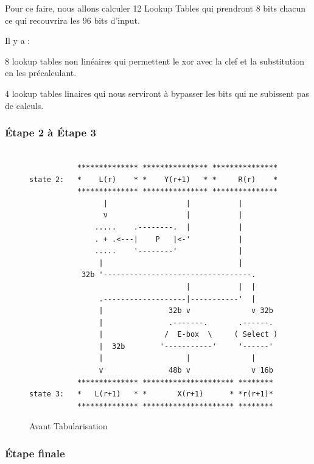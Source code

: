 \documentclass[a4paper,12pt]{article}
\begin{document}
\clearpage		
		
Pour ce faire, nous allons calculer 12 Lookup Tables qui prendront 8 bits chacun ce qui recouvrira les 96 bits d'input.

Il y a :

8 lookup tables non linéaires qui permettent le xor avec la clef et la substitution en les précalculant.


4 lookup tables linaires qui nous serviront à bypasser les bits qui ne subissent pas de calculs.		
		
\subsubsection{Étape 2 à Étape 3}

\begin{figure}[h]
\begin{verbatim}

           ************** *************** ***************
state 2:   *    L(r)    * *    Y(r+1)   * *     R(r)    *
           ************** *************** ***************
                 |                  |           |
                 v                  |           |
               .....    .--------.  |           |
               . + .<---|    P   |<-'           |
               .....    '--------'              |
                |                               |
            32b '----------------------------------.
                                    |           |  |
                .-------------------|-----------'  |
                |               32b v              v 32b
                |               .-------.       .------.
                |              /  E-box  \     ( Select )
                |  32b        '-----------'     '------'
                |                   |              |
                v               48b v              v 16b
           ************** ********************* ********
state 3:   *   L(r+1)   * *       X(r+1)      * *r(r+1)*
           ************** ********************* ********

\end{verbatim}
\caption{Avant Tabularisation}
\label{fig:ascii-box}
\end{figure}	

\newpage

\subsubsection{Étape finale}
\end{document}
